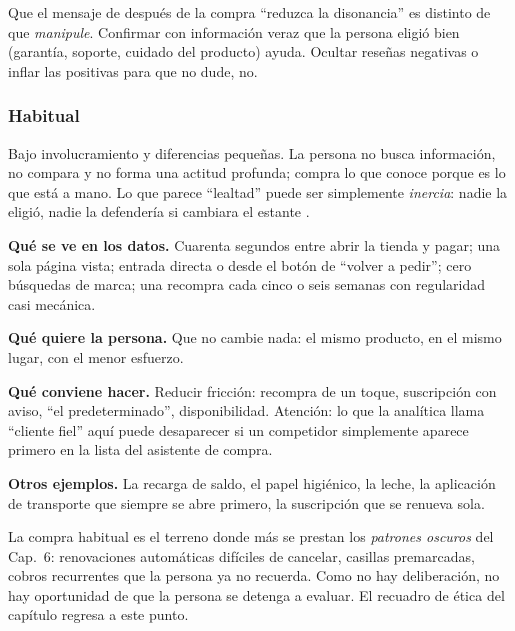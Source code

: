 \begin{cajaAtencion}
Que el mensaje de después de la compra \enquote{reduzca la disonancia} es
distinto de que \emph{manipule}. Confirmar con información veraz que la
persona eligió bien (garantía, soporte, cuidado del producto) ayuda. Ocultar
reseñas negativas o inflar las positivas para que no dude, no.
\end{cajaAtencion}

\subsubsection{Habitual}
\label{sec:cap09-habitual}

Bajo involucramiento y diferencias pequeñas. La persona no busca información,
no compara y no forma una actitud profunda; compra lo que conoce porque es lo
que está a mano. Lo que parece \enquote{lealtad} puede ser simplemente
\emph{inercia}: nadie la eligió, nadie la defendería si cambiara el estante
\parencite{assael1987}.

\begin{cajaEjemplo}[title={Ejemplo digital: el detergente de Camila}]
\textbf{Qué se ve en los datos.} Cuarenta segundos entre abrir la tienda y pagar;
una sola página vista; entrada directa o desde el botón de \enquote{volver a
pedir}; cero búsquedas de marca; una recompra cada cinco o seis semanas con
regularidad casi mecánica.

\textbf{Qué quiere la persona.} Que no cambie nada: el mismo producto, en el mismo
lugar, con el menor esfuerzo.

\textbf{Qué conviene hacer.} Reducir fricción: recompra de un toque, suscripción
con aviso, \enquote{el predeterminado}, disponibilidad. Atención: lo que la
analítica llama \enquote{cliente fiel} aquí puede desaparecer si un competidor
simplemente aparece primero en la lista del asistente de compra.
\end{cajaEjemplo}

\textbf{Otros ejemplos.} La recarga de saldo, el papel higiénico, la leche, la
aplicación de transporte que siempre se abre primero, la suscripción que se
renueva sola.

\begin{cajaAtencion}
La compra habitual es el terreno donde más se prestan los \textit{patrones
oscuros} del Cap.~6: renovaciones automáticas difíciles de cancelar, casillas
premarcadas, cobros recurrentes que la persona ya no recuerda. Como no hay
deliberación, no hay oportunidad de que la persona se detenga a evaluar. El
recuadro de ética del capítulo regresa a este punto.
\end{cajaAtencion}

